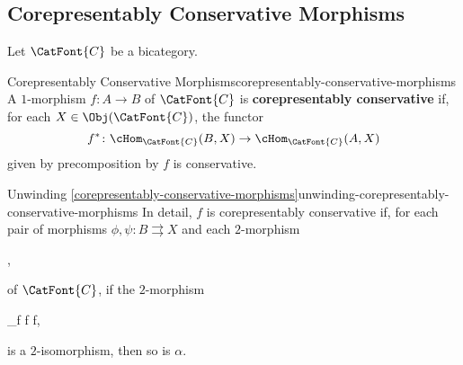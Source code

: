 \subsection{Corepresentably Conservative Morphisms}\label{subsection-corepresentably-conservative-morphisms}
Let $\CatFont{C}$ be a bicategory.
\begin{definition}{Corepresentably Conservative Morphisms}{corepresentably-conservative-morphisms}%
    A $1$-morphism $f\colon A\to B$ of $\CatFont{C}$ is \textbf{corepresentably conservative} if, for each $X\in\Obj(\CatFont{C})$, the functor
    \[
        f^{*}%
        \colon%
        \cHom_{\CatFont{C}}(B,X)%
        \to%
        \cHom_{\CatFont{C}}(A,X)%
    \]%
    given by precomposition by $f$ is conservative.
\end{definition}
\begin{remark}{Unwinding \cref{corepresentably-conservative-morphisms}}{unwinding-corepresentably-conservative-morphisms}%
    In detail, $f$ is corepresentably conservative if, for each pair of morphisms $\phi,\psi\colon B\rightrightarrows X$ and each $2$-morphism
    \begin{webcompile}
        \alpha%
        \colon%
        \phi%
        \Longrightisoarrow%
        \psi,%
        \quad%
    \end{webcompile}
    of $\CatFont{C}$, if the $2$-morphism
    \begin{webcompile}
        \alpha\twocirc\id_{f}%
        \colon%
        \phi\circ f%
        \Longrightarrow%
        \psi\circ f,%
        \quad%
    \end{webcompile}
    is a $2$-isomorphism, then so is $\alpha$.
\end{remark}

